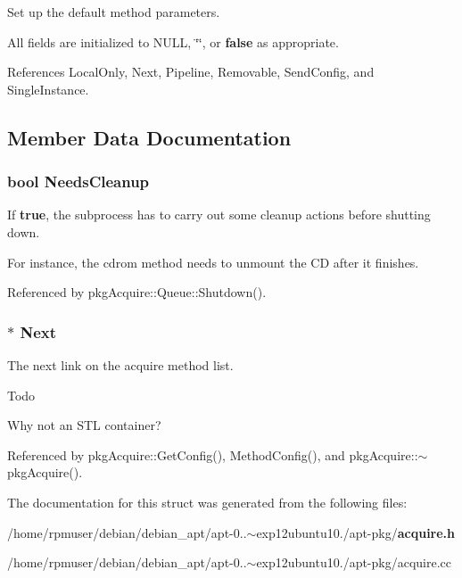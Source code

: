 \-Set up the default method parameters. 

\-All fields are initialized to \-N\-U\-L\-L, \char`\"{}\char`\"{}, or {\bfseries false} as appropriate. 

\-References \-Local\-Only, \-Next, \-Pipeline, \-Removable, \-Send\-Config, and \-Single\-Instance.



\subsection{\-Member \-Data \-Documentation}
\subsubsection[{\-Needs\-Cleanup}]{\setlength{\rightskip}{0pt plus 5cm}bool {\bf \-Needs\-Cleanup}}\label{structpkgAcquire_1_1MethodConfig_a18ab15b6a105e10118c35973765cce34}


\-If {\bfseries true}, the subprocess has to carry out some cleanup actions before shutting down. 

\-For instance, the cdrom method needs to unmount the \-C\-D after it finishes. 

\-Referenced by pkg\-Acquire\-::\-Queue\-::\-Shutdown().

\subsubsection[{\-Next}]{$\ast$ {\bf \-Next}}\label{structpkgAcquire_1_1MethodConfig_add1daf6c866236479bdac390ed41f80a}


\-The next link on the acquire method list. 

\begin{DoxyRefDesc}{\-Todo}
\item[{\bf \-Todo}]\-Why not an \-S\-T\-L container? \end{DoxyRefDesc}


\-Referenced by pkg\-Acquire\-::\-Get\-Config(), \-Method\-Config(), and pkg\-Acquire\-::$\sim$pkg\-Acquire().



\-The documentation for this struct was generated from the following files\-:\begin{DoxyCompactItemize}
\item 
/home/rpmuser/debian/debian\-\_\-apt/apt-\/0..$\sim$exp12ubuntu10./apt-\/pkg/{\bf acquire.\-h}\item 
/home/rpmuser/debian/debian\-\_\-apt/apt-\/0..$\sim$exp12ubuntu10./apt-\/pkg/acquire.\-cc\end{DoxyCompactItemize}
